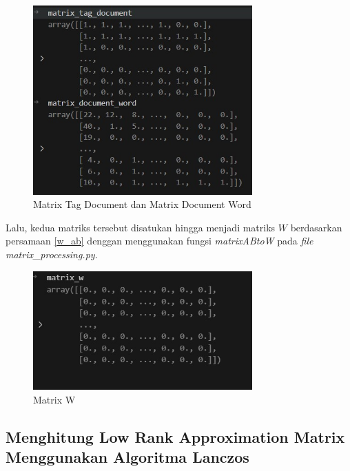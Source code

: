 \begin{figure}[H]
  \centering
  \includegraphics[width=0.75\textwidth]{gambar/bab_4_image/matrix tag document dan matrix document word.jpg}
  \caption{Matrix Tag Document dan Matrix Document Word}
  \label{gambar:matrixTagDocument}
\end{figure}

Lalu, kedua matriks tersebut disatukan hingga menjadi matriks $W$ 
berdasarkan persamaan \ref{w_ab} denggan menggunakan fungsi 
\textit{matrixABtoW} pada \textit{file} \textit{matrix\_processing.py}.

\begin{figure}[H]
  \centering
  \includegraphics[width=0.75\textwidth]{gambar/bab_4_image/matrix w.jpg}
  \caption{Matrix W}
  \label{gambar:matrixW}
\end{figure}

\subsection{Menghitung Low Rank Approximation Matrix Menggunakan Algoritma Lanczos}

